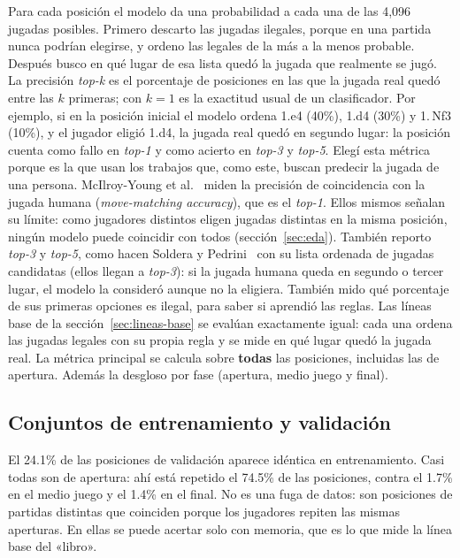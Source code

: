 \documentclass[a4paper,12pt,twocolumn]{article}
\begin{document}
Para cada posición el modelo da una probabilidad a cada una de las 4,096 jugadas posibles. Primero descarto las jugadas ilegales, porque en una partida nunca podrían elegirse, y ordeno las legales de la más a la menos probable. Después busco en qué lugar de esa lista quedó la jugada que realmente se jugó. La precisión \textit{top-k} es el porcentaje de posiciones en las que la jugada real quedó entre las $k$ primeras; con $k = 1$ es la exactitud usual de un clasificador.
\newline
Por ejemplo, si en la posición inicial el modelo ordena 1.e4 (40\%), 1.d4 (30\%) y 1.\,Nf3 (10\%), y el jugador eligió 1.d4, la jugada real quedó en segundo lugar: la posición cuenta como fallo en \textit{top-1} y como acierto en \textit{top-3} y \textit{top-5}.
\newline
Elegí esta métrica porque es la que usan los trabajos que, como este, buscan predecir la jugada de una persona. McIlroy-Young et al.~\cite{mcilroyyoung2020} miden la precisión de coincidencia con la jugada humana (\textit{move-matching accuracy}), que es el \textit{top-1}. Ellos mismos señalan su límite: como jugadores distintos eligen jugadas distintas en la misma posición, ningún modelo puede coincidir con todos (sección~\ref{sec:eda}). También reporto \textit{top-3} y \textit{top-5}, como hacen Soldera y Pedrini~\cite{soldera2026} con su lista ordenada de jugadas candidatas (ellos llegan a \textit{top-3}): si la jugada humana queda en segundo o tercer lugar, el modelo la consideró aunque no la eligiera.
\newline
También mido qué porcentaje de sus primeras opciones es ilegal, para saber si aprendió las reglas. Las líneas base de la sección~\ref{sec:lineas-base} se evalúan exactamente igual: cada una ordena las jugadas legales con su propia regla y se mide en qué lugar quedó la jugada real.
\newline
La métrica principal se calcula sobre \textbf{todas} las posiciones, incluidas las de apertura. Además la desgloso por fase (apertura, medio juego y final).

\subsection{Conjuntos de entrenamiento y validación}

El 24.1\% de las posiciones de validación aparece idéntica en entrenamiento. Casi todas son de apertura: ahí está repetido el 74.5\% de las posiciones, contra el 1.7\% en el medio juego y el 1.4\% en el final. No es una fuga de datos: son posiciones de partidas distintas que coinciden porque los jugadores repiten las mismas aperturas. En ellas se puede acertar solo con memoria, que es lo que mide la línea base del «libro».
\end{document}
